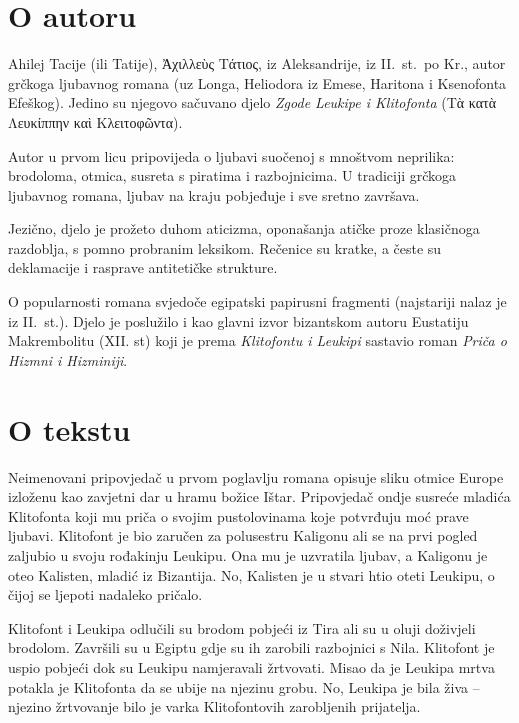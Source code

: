 
\section*{O autoru}

Ahilej Tacije (ili Tatije), Ἀχιλλεὺς Τάτιος, iz Aleksandrije, iz II.~st.\ po Kr., autor grčkoga ljubavnog romana (uz Longa, Heliodora iz Emese, Haritona i Ksenofonta Efeškog). Jedino su njegovo sačuvano djelo \textit{Zgode Leukipe i Klitofonta} \textgreek{(Τὰ κατὰ Λευκίππην καὶ Κλειτοφῶντα).}

Autor u prvom licu pripovijeda o ljubavi suočenoj s mnoštvom neprilika: brodoloma, otmica, susreta s piratima i razbojnicima. U tradiciji grčkoga ljubavnog romana, ljubav na kraju pobjeđuje i sve sretno završava.

Jezično, djelo je prožeto duhom aticizma, oponašanja atičke proze klasičnoga razdoblja, s pomno probranim leksikom. Rečenice su kratke, a česte su deklamacije i rasprave antitetičke strukture.

O popularnosti romana svjedoče egipatski papirusni fragmenti (najstariji nalaz je iz II.~st.). Djelo je poslužilo i kao glavni izvor bizantskom autoru Eustatiju Makrembolitu (XII. st) koji je prema \textit{Klitofontu i Leukipi} sastavio roman \textit{Priča o Hizmni i Hizminiji}.


\section*{O tekstu}

Neimenovani pripovjedač u prvom poglavlju romana opisuje sliku otmice Europe izloženu kao zavjetni dar u hramu božice Ištar. Pripovjedač ondje susreće mladića Klitofonta koji mu priča o svojim pustolovinama koje potvrđuju moć prave ljubavi. Klitofont je bio zaručen za polusestru Kaligonu ali se na prvi pogled zaljubio u svoju rođakinju Leukipu. Ona mu je uzvratila ljubav, a Kaligonu je oteo Kalisten, mladić iz Bizantija. No, Kalisten je u stvari htio oteti Leukipu, o čijoj se ljepoti nadaleko pričalo.

Klitofont i Leukipa odlučili su brodom pobjeći iz Tira ali su u oluji doživjeli brodolom. Završili su u Egiptu gdje su ih zarobili razbojnici s Nila. Klitofont je uspio pobjeći dok su Leukipu namjeravali žrtvovati. Misao da je Leukipa mrtva potakla je Klitofonta da se ubije na njezinu grobu. No, Leukipa je bila živa – njezino žrtvovanje bilo je varka Klitofontovih zarobljenih prijatelja.

